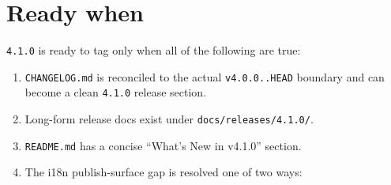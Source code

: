 \section{Ready when}\label{record-202-ready-when}

\texttt{4\allowbreak{}.\allowbreak{}1\allowbreak{}.\allowbreak{}0} is ready to tag only when all of the following are true:

\begin{enumerate}
\def\labelenumi{\arabic{enumi}.}
\tightlist
\item
  \texttt{C\allowbreak{}H\allowbreak{}A\allowbreak{}N\allowbreak{}G\allowbreak{}E\allowbreak{}L\allowbreak{}O\allowbreak{}G\allowbreak{}.\allowbreak{}m\allowbreak{}d} is reconciled to the actual \texttt{v\allowbreak{}4\allowbreak{}.\allowbreak{}0\allowbreak{}.\allowbreak{}0\allowbreak{}.\allowbreak{}.\allowbreak{}H\allowbreak{}E\allowbreak{}A\allowbreak{}D} boundary and can become a clean \texttt{4\allowbreak{}.\allowbreak{}1\allowbreak{}.\allowbreak{}0} release section.
\item
  Long-form release docs exist under \texttt{d\allowbreak{}o\allowbreak{}c\allowbreak{}s\allowbreak{}/\allowbreak{}r\allowbreak{}e\allowbreak{}l\allowbreak{}e\allowbreak{}a\allowbreak{}s\allowbreak{}e\allowbreak{}s\allowbreak{}/\allowbreak{}4\allowbreak{}.\allowbreak{}1\allowbreak{}.\allowbreak{}0\allowbreak{}/}.
\item
  \texttt{R\allowbreak{}E\allowbreak{}A\allowbreak{}D\allowbreak{}M\allowbreak{}E\allowbreak{}.\allowbreak{}m\allowbreak{}d} has a concise ``What's New in v4.1.0'' section.
\item
  The i18n publish-surface gap is resolved one of two ways:


\end{enumerate}
